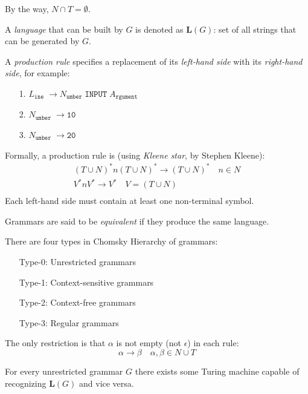\documentclass{article}
\begin{document}
By the way, $N \cap T = \emptyset$.
\plush{}

A \emph{language} that can be built by $G$ is denoted as $\bm{L}(G)$: set of all strings that can be generated by $G$.
\plush{}

A \emph{production rule} specifies a replacement of its \emph{left-hand side} with its \emph{right-hand side}, for example:
\begin{enumerate}
    \item[1.] $L_\texttt{ine} \; \to N_\texttt{umber} \; \texttt{INPUT} \; A_\texttt{rgument}$
    \item[2.] $N_\texttt{umber} \; \to \texttt{10}$
    \item[3.] $N_\texttt{umber} \; \to \texttt{20}$
\end{enumerate}

Formally, a production rule is (using \emph{Kleene star}, by Stephen Kleene):
\begin{gather*}
(T \cup N)^* n (T \cup N)^* \to (T \cup N)^* \quad n \in N \\
V^* n V^* \to V^* \quad V = (T \cup N) \\
\end{gather*}
Each left-hand side must contain at least one non-terminal symbol.
\plush{}

Grammars are said to be \emph{equivalent} if they produce the same language.
\plush{}


There are four types in Chomsky Hierarchy of grammars:
\begin{enumerate}
  \item[Type-0:] Unrestricted grammars
  \item[Type-1:] Context-sensitive grammars
  \item[Type-2:] Context-free grammars
  \item[Type-3:] Regular grammars
\end{enumerate}
\plush{}


The only restriction is that $\alpha$ is not empty (not \(\epsilon\)) in each rule:
\begin{equation*}
\alpha \to \beta \quad \alpha, \beta \in N \cup T
\end{equation*}

For every unrestricted grammar $G$ there exists some Turing machine capable of recognizing $\bm{L}(G)$ and vice versa.
\plush{}
\end{document}
